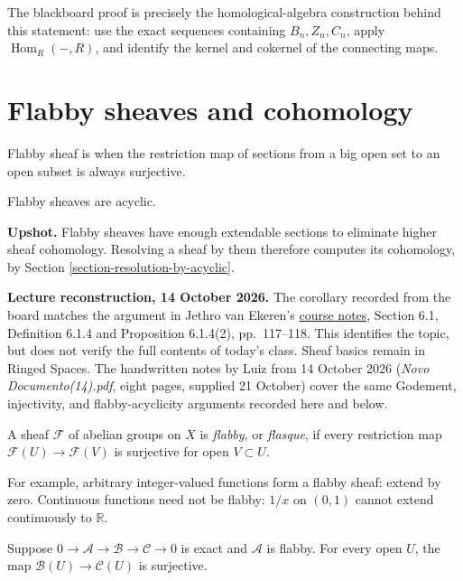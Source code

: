 \noindent
The blackboard proof is precisely the
homological-algebra construction behind this
statement: use the exact sequences containing
$B_n,Z_n,C_n$, apply $\operatorname{Hom}_R(-,R)$,
and identify the kernel and cokernel of the
connecting maps.

\section{Flabby sheaves and cohomology}
\label{section-flabby-sheaves}

Flabby sheaf is when the restriction map of sections
from a big open set to an open subset is always surjective.

Flabby sheaves are acyclic.

\noindent
{\bf Upshot.} Flabby sheaves have enough
extendable sections to eliminate higher
sheaf cohomology. Resolving a sheaf by them
therefore computes its cohomology, by
Section \ref{section-resolution-by-acyclic}.

\medskip\noindent
{\bf Lecture reconstruction, 14 October
2026.} The corollary recorded from the
board matches the argument in Jethro van
Ekeren's
\href{https://w3.impa.br/~jethro/%
2026-2/ah-current.pdf}{course notes},
Section 6.1, Definition 6.1.4 and
Proposition 6.1.4(2), pp.~117--118.
This identifies the topic, but does not
verify the full contents of today's class.
Sheaf basics remain in Ringed Spaces.
The handwritten notes by Luiz from 14 October 2026
(\emph{Novo Documento(14).pdf}, eight pages, supplied
21 October) cover the same Godement, injectivity, and
flabby-acyclicity arguments recorded here and below.

\begin{definition}
\label{definition-flabby}
A sheaf $\mathcal{F}$ of abelian groups
on $X$ is {\it flabby}, or {\it flasque},
if every restriction map
$
\mathcal{F}(U)\longrightarrow\mathcal{F}(V)
$
is surjective for open $V\subset U$.
\end{definition}


\noindent
For example, arbitrary integer-valued
functions form a flabby sheaf: extend by
zero. Continuous functions need not be
flabby: $1/x$ on $(0,1)$ cannot extend
continuously to $\mathbb{R}$.

\begin{lemma}
\label{lemma-flabby-kernel-sections}
Suppose
$
0\to\mathcal{A}\to\mathcal{B}
\to\mathcal{C}\to0
$
is exact and $\mathcal{A}$ is flabby.
For every open $U$, the map
$
\mathcal{B}(U)\to\mathcal{C}(U)
$
is surjective.
\end{lemma}

